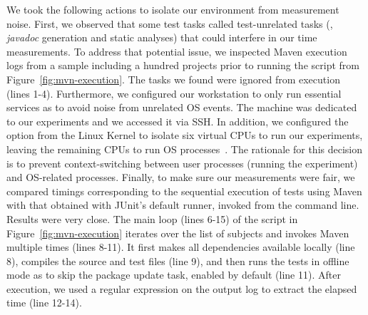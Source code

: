 We took the following actions to isolate our environment from
measurement noise.
First, we observed that some test tasks called test-unrelated tasks
(\eg, \emph{javadoc} generation and static analyses) that could
interfere in our time measurements.
To address that potential issue, we inspected Maven execution logs
from a sample including a hundred projects prior to running the script
from Figure~\ref{fig:mvn-execution}.
The tasks we found were ignored from execution (lines 1-4).
Furthermore, we configured
our workstation to only run essential services as to avoid noise from unrelated OS events.
The machine was dedicated to our experiments and we
accessed it via SSH. In addition, we configured the 
option from the Linux Kernel \cite{linux-kernel} to isolate six
virtual CPUs to run our experiments, leaving the remaining CPUs to run
OS processes~\cite{isolcpus-use}.  The rationale for this decision is
to prevent context-switching between user processes (running the
experiment) and OS-related processes.  Finally, to make sure our
measurements were fair, we compared timings corresponding to the
sequential execution of tests using Maven with that obtained with
JUnit's default  runner, invoked from the command
line.  Results were very close.
The main loop (lines 6-15) of the script in
Figure~\ref{fig:mvn-execution} iterates over the list of subjects and
invokes Maven multiple times (lines 8-11).  It first makes all dependencies available locally
(line 8), compiles the source and test files (line 9), and then runs
the tests in offline mode as to skip the package update task, enabled
by default (line 11). After execution, we used a regular expression on
the output log to extract the elapsed time (line 12-14).





